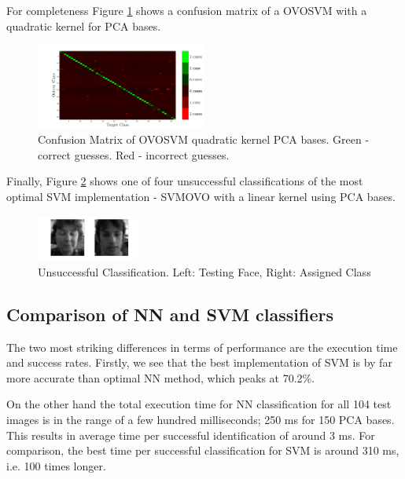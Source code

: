 \documentclass[10pt,twocolumn,letterpaper]{article}
\begin{document}
For completeness Figure \ref{fig:confSVM} shows a confusion matrix of a OVOSVM with a quadratic kernel for PCA bases.

\begin{figure}[H]
\begin{center}
  
    \includegraphics[width=0.5\textwidth]{../results/Q3_PCA_ONO_confusion}

  \caption{Confusion Matrix of OVOSVM quadratic kernel PCA bases. Green - correct guesses. Red - incorrect guesses. \label{fig:confSVM}}

\end{center}
\end{figure}

Finally, Figure \ref{fig:failSVM} shows one of four unsuccessful classifications of the most optimal SVM implementation - SVMOVO with a linear kernel using PCA bases.

\begin{figure}[H]
\begin{center}
  
    \includegraphics[width=0.3\textwidth]{../results/svmFail}

  \caption{Unsuccessful Classification. Left: Testing Face, Right: Assigned Class \label{fig:failSVM}}

\end{center}
\end{figure}

\subsection{Comparison of NN and SVM classifiers}
The two most striking differences in terms of performance are the execution time and success rates. Firstly, we see that the best implementation of SVM is by far more accurate than optimal NN method, which peaks at 70.2\%.

On the other hand the total execution time for NN classification for all 104 test images is in the range of a few hundred milliseconds; 250 ms for 150 PCA bases. This results in average time per successful identification of around 3 ms. For comparison, the best time per successful classification for SVM is around 310 ms, i.e. 100 times longer.
\end{document}
